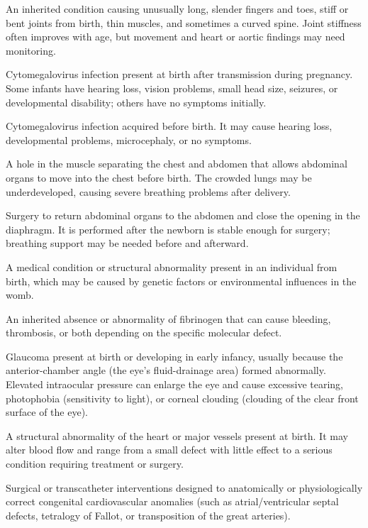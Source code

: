  An inherited condition causing unusually long, slender fingers and toes, stiff or bent joints from birth, thin muscles, and sometimes a curved spine. Joint stiffness often improves with age, but movement and heart or aortic findings may need monitoring.

 Cytomegalovirus infection present at birth after transmission during pregnancy. Some infants have hearing loss, vision problems, small head size, seizures, or developmental disability; others have no symptoms initially.

 Cytomegalovirus infection acquired before birth. It may cause hearing loss,
developmental problems, microcephaly, or no symptoms.

 A hole in the muscle separating the chest and abdomen that allows abdominal organs to move into the chest before birth. The crowded lungs may be underdeveloped, causing severe breathing problems after delivery.

 Surgery to return abdominal organs to the abdomen and close the opening in the diaphragm. It is performed after the newborn is stable enough for surgery; breathing support may be needed before and afterward.

 A medical condition or structural abnormality present in an individual from birth, which
may be caused by genetic factors or environmental influences in the womb.

 An inherited absence or abnormality of fibrinogen that can cause bleeding, thrombosis, or both depending on the specific molecular defect.

 Glaucoma present at birth or developing in early infancy, usually because the anterior-chamber angle (the eye’s fluid-drainage area) formed abnormally. Elevated intraocular pressure can enlarge the eye and cause excessive tearing, photophobia (sensitivity to light), or corneal clouding (clouding of the clear front surface of the eye).

 A structural abnormality of the heart or major vessels present at birth. It may alter blood flow and range from a small defect with little effect to a serious condition requiring treatment or surgery.

 Surgical or transcatheter interventions designed to anatomically or physiologically correct congenital cardiovascular anomalies (such as atrial/ventricular septal defects, tetralogy of Fallot, or transposition of the great arteries).

